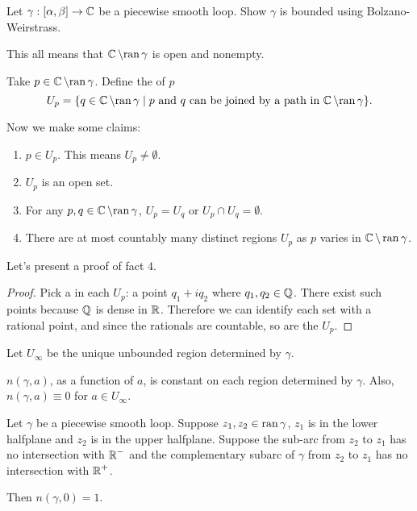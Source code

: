 \begin{exercise}
    Let $\gamma : [\alpha, \beta] \to \operatorname{\mathbb{C}}$ be a piecewise smooth loop.  Show $\gamma$ is bounded using Bolzano-Weirstrass.
\end{exercise}

\smallbreak
This all means that $\operatorname{\mathbb{C}} \setminus {\operatorname{ran}} \, \gamma$ is open and nonempty.

\begin{definition}
    Take $p \in \operatorname{\mathbb{C}} \setminus {\operatorname{ran}} \, \gamma$.
    Define the  of $p$
    \[ U_p = \{ q \in \operatorname{\mathbb{C}} \setminus {\operatorname{ran}} \, \gamma \; | \; 
    \text{$p$ and $q$ can be joined by a path in $\operatorname{\mathbb{C}} \setminus {\operatorname{ran}} \, \gamma$} \}. \]
\end{definition}
Now we make some claims:

\begin{enumerate}
    \item $p \in  U_p$.  This means $U_p \ne \emptyset$.

    \item $U_p$ is an open set.

    \item For any $p,q \in \operatorname{\mathbb{C}} \setminus {\operatorname{ran}} \, \gamma$, $U_p = U_q$ or $U_p \cap U_q = \emptyset$.

    \item There are at most countably many distinct regions $U_p$ as $p$ varies in $\operatorname{\mathbb{C}} \setminus \operatorname{ran}{\gamma}$.
\end{enumerate}

Let's present a proof of fact $4$.

\begin{proof}
    Pick a  in each $U_p$: a point $q_1 + iq_2$ where $q_1, q_2 \in \operatorname{\mathbb{Q}}$.
    There exist such points because $\operatorname{\mathbb{Q}}$ is dense in $\operatorname{\mathbb{R}}$.
    Therefore we can identify each set with a rational point, and since the rationals are countable, so are the $U_p$.
\end{proof}

Let $U_{\infty}$ be the unique unbounded region determined by $\gamma$.

\begin{theorem}
    $n(\gamma, a)$, as a function of $a$, is constant on each region determined by $\gamma$.
    Also, $n(\gamma, a) \equiv 0$ for $a \in U_{\infty}$. 
\end{theorem}

\begin{theorem}
    Let $\gamma$ be a piecewise smooth loop.
    Suppose $z_1, z_2 \in \operatorname{ran}{\gamma}$, $z_1$ is in the lower halfplane and $z_2$ is in the upper halfplane.
    Suppose the sub-arc from $z_2$ to $z_1$ has no intersection with $\operatorname{\mathbb{R}}^-$ and the complementary subarc of $\gamma$ from $z_2$ to $z_1$ has no intersection with $\operatorname{\mathbb{R}}^+$.

    \noindent
    Then $n(\gamma, 0) = 1$.
\end{theorem}

